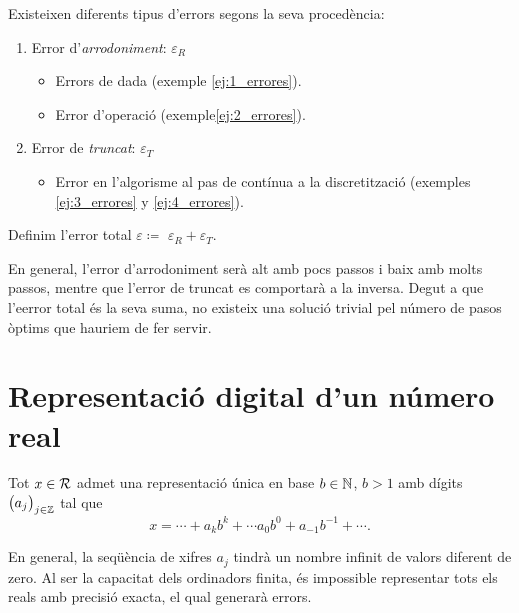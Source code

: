 \begin{defi}[error]
    Existeixen diferents tipus d'errors segons la seva procedència:
    \begin{enumerate}
            \item Error d'\emph{arrodoniment}: $\varepsilon_R$
            \begin{itemize}
                    \item Errors de dada (exemple \ref{ej:1_errores}).
                    \item Error d'operació (exemple\ref{ej:2_errores}).
            \end{itemize}
            \item Error de \emph{truncat}: $\varepsilon_T$
            \begin{itemize}
                    \item Error en l'algorisme al pas de contínua a la discretització (exemples \ref{ej:3_errores} y \ref{ej:4_errores}).
            \end{itemize}
    \end{enumerate}
\end{defi}

\begin{defi}
    Definim l'error total $\varepsilon \coloneqq$ $\varepsilon_R + \varepsilon_T$.
\end{defi}

\begin{obs}
  En general, l'error d'arrodoniment serà alt amb pocs passos i baix amb molts passos, mentre que l'error de truncat es comportarà a la inversa. Degut a que l'eerror total és la seva suma, no existeix una solució trivial pel número de pasos òptims que hauriem de fer servir. 
\end{obs}

\section{Representació digital d'un número real}
    
\begin{prop}
    Tot $x \in \mathcal{R}$ admet una representació única en base $b \in \mathbb{N}$, $b>1$ amb dígits $\left(  a_j\right)  _{j \in \mathbb{Z}}$ tal que 
    \[
            x = \cdots + a_kb^k + \cdots a_0b^0 + a_{-1}b^{-1} + \cdots \nonumber.
    \]
\end{prop}

\begin{obs}
  En general, la seqüència de xifres $a_j$ tindrà un nombre infinit de valors diferent de zero. Al ser la capacitat dels ordinadors finita, és impossible representar tots els reals amb precisió exacta, el qual generarà errors.
\end{obs}

